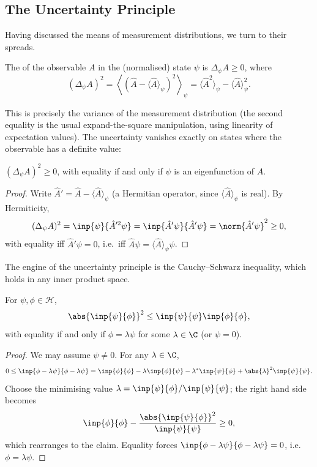\subsection{The Uncertainty Principle}

Having discussed the means of measurement distributions, we turn to their spreads.

\begin{definition}[Uncertainty]
    The  of the observable $A$ in the (normalised) state $\psi$ is $\Delta_\psi A \geq 0$, where
    $$
    (\Delta_\psi A)^2 = \left\langle (\hat{A} - \langle \hat{A} \rangle_\psi)^2 \right\rangle_\psi = \langle \hat{A}^2 \rangle_\psi - \langle \hat{A} \rangle_\psi^2.
    $$
\end{definition}

This is precisely the variance of the measurement distribution (the second equality is the usual expand-the-square manipulation, using linearity of expectation values). The uncertainty vanishes exactly on states where the observable has a definite value:

\begin{lemma}
    $(\Delta_\psi A)^2 \geq 0$, with equality if and only if $\psi$ is an eigenfunction of $\hat{A}$.
\end{lemma}
\begin{proof}
    Write $\hat{A}' = \hat{A} - \langle \hat{A} \rangle_\psi$ (a Hermitian operator, since $\langle \hat A \rangle_\psi$ is real). By Hermiticity,
    $$
    (\Delta_\psi A)^2 = \inp{\psi}{\hat{A}'^2 \psi} = \inp{\hat{A}' \psi}{\hat{A}' \psi} = \norm{\hat{A}' \psi}^2 \geq 0,
    $$
    with equality iff $\hat{A}'\psi = 0$, i.e.\ iff $\hat{A} \psi = \langle \hat{A}\rangle_\psi \psi$.
\end{proof}

The engine of the uncertainty principle is the Cauchy--Schwarz inequality, which holds in any inner product space.

\begin{theorem}
    For $\psi, \phi \in \mathcal{H}$,
    $$
    \abs{\inp{\psi}{\phi}}^2 \leq \inp{\psi}{\psi} \inp{\phi}{\phi},
    $$
    with equality if and only if $\phi = \lambda \psi$ for some $\lambda \in \C$ (or $\psi = 0$).
\end{theorem}
\begin{proof}
    We may assume $\psi \neq 0$. For any $\lambda \in \C$,
    $$
    0 \leq \inp{\phi - \lambda \psi}{\phi - \lambda \psi} = \inp{\phi}{\phi} - \lambda \inp{\phi}{\psi} - \lambda^* \inp{\psi}{\phi} + \abs{\lambda}^2 \inp{\psi}{\psi}.
    $$
    Choose the minimising value $\lambda = \inp{\psi}{\phi} / \inp{\psi}{\psi}$; the right hand side becomes
    $$
    \inp{\phi}{\phi} - \frac{\abs{\inp{\psi}{\phi}}^2}{\inp{\psi}{\psi}} \geq 0,
    $$
    which rearranges to the claim. Equality forces $\inp{\phi - \lambda\psi}{\phi - \lambda \psi} = 0$, i.e.\ $\phi = \lambda \psi$.
\end{proof}

